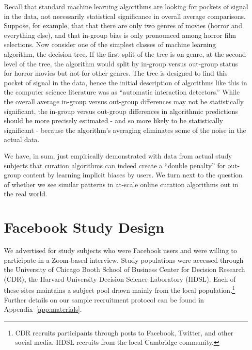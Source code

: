 \documentclass[12pt,letterpaper]{article}
\begin{document}
Recall that standard machine learning algorithms are looking for pockets of signal in the data, not necessarily statistical significance in overall average comparisons. Suppose, for example, that that there are only two genres of movies (horror and everything else), and that in-group bias is only pronounced among horror film selections. Now consider one of the simplest classes of machine learning algorithm, the decision tree. If the first split of the tree is on genre, at the second level of the tree, the algorithm would split by in-group versus out-group status for horror movies but not for other genres. The tree is designed to find this pocket of signal in the data, hence the initial description of algorithms like this in the computer science literature was as ``automatic interaction detectors.'' While the overall average in-group versus out-group differences may not be statistically significant, the in-group versus out-group differences in algorithmic predictions should be more precisely estimated - and so more likely to be statistically significant - because the algorithm's averaging eliminates some of the noise in the actual data.

We have, in sum, just empirically demonstrated with data from actual study subjects that curation algorithms can indeed create a ``double penalty'' for out-group content by learning implicit biases by users. We turn next to the question of whether we see similar patterns in at-scale online curation algorithms out in the real world.



\section{Facebook Study Design} 

We advertised for study subjects who were Facebook users and were willing to participate in a Zoom-based interview. Study populations were accessed through the University of Chicago Booth School of Business Center for Decision Research (CDR), the Harvard University Decision Science Laboratory (HDSL). Each of these sites maintains a subject pool drawn mainly from the local population.\footnote{CDR recruits participants through posts to Facebook, Twitter, and other social media. HDSL recruits from the local Cambridge community.} Further details on our sample recruitment protocol can be found in Appendix~\ref{app:materials}.
\end{document}
